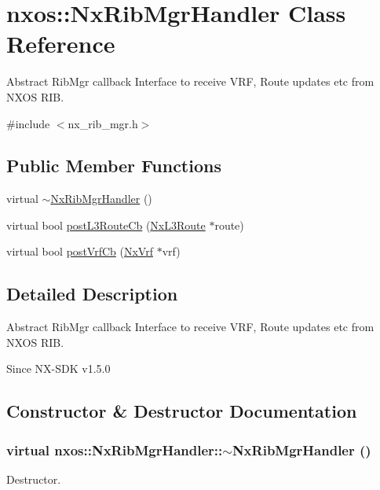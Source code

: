 \hypertarget{classnxos_1_1NxRibMgrHandler}{
\section{nxos::NxRibMgrHandler Class Reference}
\label{classnxos_1_1NxRibMgrHandler}
}


Abstract RibMgr callback Interface to receive VRF, Route updates etc from NXOS RIB.  


{\ttfamily \#include $<$nx\_\-rib\_\-mgr.h$>$}\subsection*{Public Member Functions}
\begin{DoxyCompactItemize}
\item 
virtual \hyperlink{classnxos_1_1NxRibMgrHandler_a0b2d07d8f5547b196f6eda3d77f9ca97}{$\sim$NxRibMgrHandler} ()
\item 
virtual bool \hyperlink{classnxos_1_1NxRibMgrHandler_a1b742d50365fdece0ea47eb38300f7de}{postL3RouteCb} (\hyperlink{classnxos_1_1NxL3Route}{NxL3Route} $\ast$route)
\item 
virtual bool \hyperlink{classnxos_1_1NxRibMgrHandler_a2ed5a3ad9c0e55d21e18d88a19419a5e}{postVrfCb} (\hyperlink{classnxos_1_1NxVrf}{NxVrf} $\ast$vrf)
\end{DoxyCompactItemize}


\subsection{Detailed Description}
Abstract RibMgr callback Interface to receive VRF, Route updates etc from NXOS RIB. \begin{DoxySince}{Since}
NX-\/SDK v1.5.0 
\end{DoxySince}


\subsection{Constructor \& Destructor Documentation}
\hypertarget{classnxos_1_1NxRibMgrHandler_a0b2d07d8f5547b196f6eda3d77f9ca97}{
\subsubsection[{$\sim$NxRibMgrHandler}]{\setlength{\rightskip}{0pt plus 5cm}virtual nxos::NxRibMgrHandler::$\sim$NxRibMgrHandler ()}}
\label{classnxos_1_1NxRibMgrHandler_a0b2d07d8f5547b196f6eda3d77f9ca97}
Destructor. 

